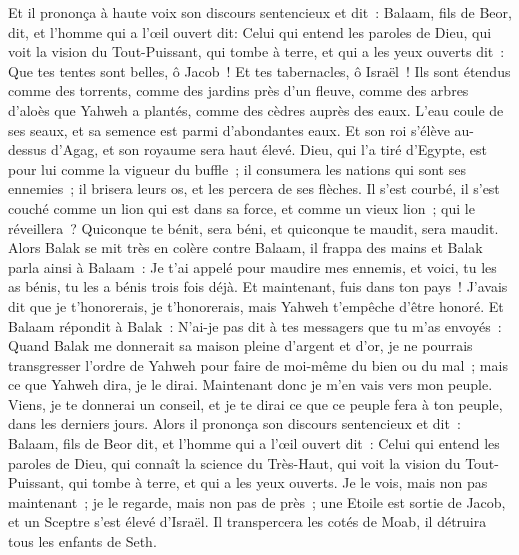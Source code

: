 \begin{multicols}{2}
Et il prononça à haute voix son discours sentencieux et dit~: Balaam, fils de Beor, dit, et l'homme qui a l'œil ouvert dit:
Celui qui entend les paroles de Dieu, qui voit la vision du Tout-Puissant, qui tombe à terre, et qui a les yeux ouverts dit~:
Que tes tentes sont belles, ô Jacob~! Et tes tabernacles, ô Israël~!
Ils sont étendus comme des torrents, comme des jardins près d'un fleuve, comme des arbres d'aloès que Yahweh a plantés, comme des cèdres auprès des eaux.
L'eau coule de ses seaux, et sa semence est parmi d'abondantes eaux. Et son roi s'élève au-dessus d'Agag, et son royaume sera haut élevé.
Dieu, qui l'a tiré d'Egypte, est pour lui comme la vigueur du buffle~; il consumera les nations qui sont ses ennemies~; il brisera leurs os, et les percera de ses flèches.
Il s'est courbé, il s'est couché comme un lion qui est dans sa force, et comme un vieux lion~; qui le réveillera~? Quiconque te bénit, sera béni, et quiconque te maudit, sera maudit.
Alors Balak se mit très en colère contre Balaam, il frappa des mains et Balak parla ainsi à Balaam~: Je t'ai appelé pour maudire mes ennemis, et voici, tu les as bénis, tu les a bénis trois fois déjà.
Et maintenant, fuis dans ton pays~! J'avais dit que je t'honorerais, je t'honorerais, mais Yahweh t'empêche d'être honoré.
Et Balaam répondit à Balak~: N'ai-je pas dit à tes messagers que tu m'as envoyés~:
Quand Balak me donnerait sa maison pleine d'argent et d'or, je ne pourrais transgresser l'ordre de Yahweh pour faire de moi-même du bien ou du mal~; mais ce que Yahweh dira, je le dirai.
Maintenant donc je m'en vais vers mon peuple. Viens, je te donnerai un conseil, et je te dirai ce que ce peuple fera à ton peuple, dans les derniers jours.
Alors il prononça son discours sentencieux et dit~: Balaam, fils de Beor dit, et l'homme qui a l'œil ouvert dit~:
Celui qui entend les paroles de Dieu, qui connaît la science du Très-Haut, qui voit la vision du Tout-Puissant, qui tombe à terre, et qui a les yeux ouverts.
Je le vois, mais non pas maintenant~; je le regarde, mais non pas de près~; une Etoile est sortie de Jacob, et un Sceptre s'est élevé d'Israël. Il transpercera les cotés de Moab, il détruira tous les enfants de Seth.

\end{multicols}
